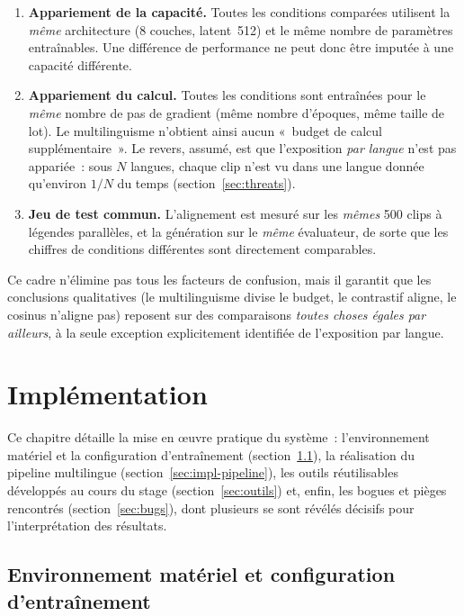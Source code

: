 \documentclass[12pt,a4paper,oneside]{report}
\theoremstyle{definition}
\theoremstyle{plain}
\begin{document}
\begin{enumerate}[leftmargin=*]
\item \textbf{Appariement de la capacité.} Toutes les conditions comparées
utilisent la \emph{même} architecture (8 couches, latent~512) et le même nombre de
paramètres entraînables. Une différence de performance ne peut donc être imputée à
une capacité différente.
\item \textbf{Appariement du calcul.} Toutes les conditions sont entraînées pour le
\emph{même} nombre de pas de gradient (même nombre d'époques, même taille de lot).
Le multilinguisme n'obtient ainsi aucun «~budget de calcul supplémentaire~». Le
revers, assumé, est que l'exposition \emph{par langue} n'est pas appariée~: sous
$N$ langues, chaque clip n'est vu dans une langue donnée qu'environ $1/N$ du temps
(section~\ref{sec:threats}).
\item \textbf{Jeu de test commun.} L'alignement est mesuré sur les \emph{mêmes}
500 clips à légendes parallèles, et la génération sur le \emph{même} évaluateur, de
sorte que les chiffres de conditions différentes sont directement comparables.
\end{enumerate}

Ce cadre n'élimine pas tous les facteurs de confusion, mais il garantit que les
conclusions qualitatives (le multilinguisme divise le budget, le contrastif aligne,
le cosinus n'aligne pas) reposent sur des comparaisons \emph{toutes choses égales
par ailleurs}, à la seule exception explicitement identifiée de l'exposition
par langue.

\chapter{Implémentation}
\label{ch:implementation}

Ce chapitre détaille la mise en œuvre pratique du système~: l'environnement
matériel et la configuration d'entraînement (section~\ref{sec:hw}), la réalisation
du pipeline multilingue (section~\ref{sec:impl-pipeline}), les outils réutilisables
développés au cours du stage (section~\ref{sec:outils}) et, enfin, les bogues et
pièges rencontrés (section~\ref{sec:bugs}), dont plusieurs se sont révélés
décisifs pour l'interprétation des résultats.

\section{Environnement matériel et configuration d'entraînement}
\label{sec:hw}
\end{document}

